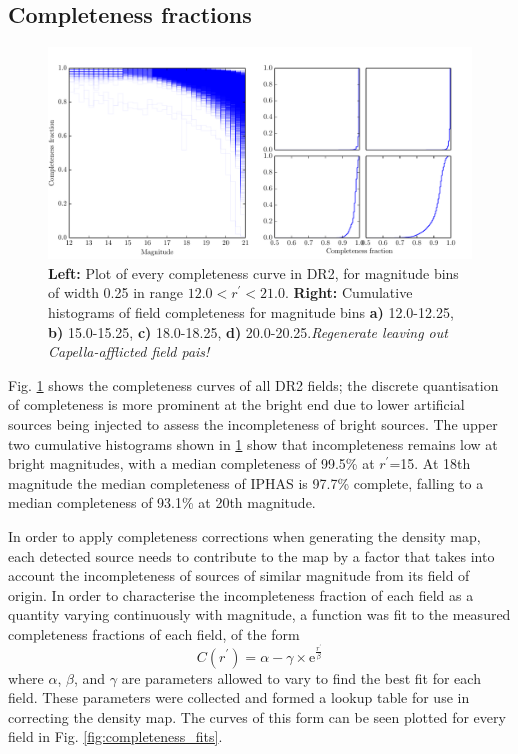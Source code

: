 \documentclass[a4paper,useAMS,usenatbib]{mn2e}
\begin{document}
\subsection{Completeness fractions}

\begin{figure}
\begin{center}
\includegraphics[width=1\textwidth]{figures/completeness_curves.pdf} 
\caption{\footnotesize \textbf{Left:} Plot of every completeness curve in DR2, for magnitude bins of width 0.25 in range $12.0<r^{\prime}<21.0$. \textbf{Right:} Cumulative histograms of field completeness for magnitude bins \textbf{a)} 12.0-12.25, \textbf{b)} 15.0-15.25, \textbf{c)} 18.0-18.25, \textbf{d)} 20.0-20.25.\textit{Regenerate leaving out Capella-afflicted field pais!}}
\label{fig:completeness_curves}
\end{center}
\end{figure}

Fig. \ref{fig:completeness_curves} shows the completeness curves of all DR2 fields; the discrete quantisation of completeness is more prominent at the bright end due to lower artificial sources being injected to assess the incompleteness of bright sources. The upper two cumulative histograms shown in \ref{fig:completeness_curves} show that incompleteness remains low at bright magnitudes, with a median completeness of 99.5\% at $r^{\prime}$=15. At 18th magnitude the median completeness of IPHAS is 97.7\% complete, falling to a median completeness of 93.1\% at 20th magnitude.

In order to apply completeness corrections when generating the density map, each detected source needs to contribute to the map by a factor that takes into account the incompleteness of sources of similar magnitude from its field of origin. In order to characterise the incompleteness fraction of each field as a quantity varying continuously with magnitude, a function was fit to the measured completeness fractions of each field, of the form
\begin{equation}
C(r^{\prime}) = \alpha - \gamma \times \mathrm{e}^{\frac{r^{\prime}}{\beta}}
\label{eq:completeness_curve}
\end{equation}
\noindent where $\alpha$, $\beta$, and $\gamma$ are parameters allowed to vary to find the best fit for each field. These parameters were collected and formed a lookup table for use in correcting the density map. The curves of this form can be seen plotted for every field in Fig. \ref{fig:completeness_fits}.
\end{document}
